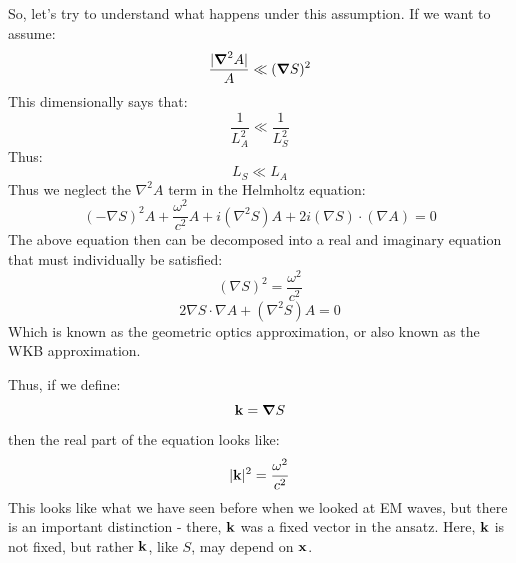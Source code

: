 So, let's try to understand what happens under this assumption. If we want to assume:
\begin{equation}
    \frac{\abs{\nabla^2 A}}{A} \ll (\nabla S)^2
\end{equation}
This dimensionally says that:
\begin{equation}
    \frac{1}{L_A^2} \ll \frac{1}{L_S^2}
\end{equation}
Thus:
\begin{equation}
    L_S \ll L_A
\end{equation}
Thus we neglect the $\nabla^2 A$ term in the Helmholtz equation:\begin{equation}
    (-\nabla S)^2 A + \frac{\omega^2}{c^2}A + i(\nabla^2 S)A + 2i(\nabla S)\cdot(\nabla A) = 0
\end{equation}
The above equation then can be decomposed into a real and imaginary equation that must individually be satisfied:
\begin{equation}
    (\nabla S)^2 = \frac{\omega^2}{c^2}
\end{equation}
\begin{equation}
    2\nabla S \cdot \nabla A + (\nabla^2 S)A = 0
\end{equation}
Which is known as the geometric optics approximation, or also known as the WKB approximation.

Thus, if we define:
\begin{equation}
    \v{k} = \nabla S
\end{equation}
then the real part of the equation looks like:
\begin{equation}
    \lvert \mathbf{k} \rvert^2 = \frac{\omega^2}{c^2}
\end{equation}
This looks like what we have seen before when we looked at EM waves, but there is an important distinction - there, $\mathbf{k}$ was a fixed vector in the ansatz. Here, $\mathbf{k}$ is not fixed, but rather $\mathbf{k}$, like $S$, may depend on $\mathbf{x}$.